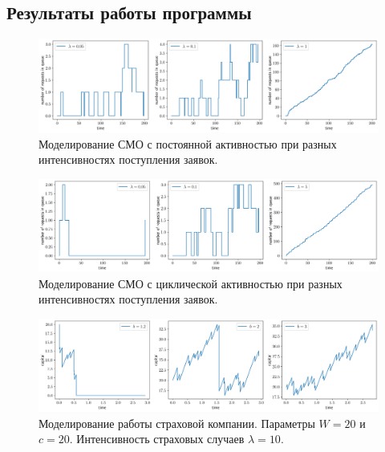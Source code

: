 \documentclass[12pt, a4paper]{article} %
\begin{document}
\subsection{Результаты работы программы}
\begin{figure}[H]
    \centering
    \includegraphics[width=\textwidth]{figures/11_vanilla.png}
    \caption{Моделирование СМО с постоянной активностью при разных интенсивностях поступления заявок.}
    \label{fig:11_vanilla}
\end{figure}
\begin{figure}[H]
    \centering
    \includegraphics[width=\textwidth]{figures/11_cyclic.png}
    \caption{Моделирование СМО с циклической активностью при разных интенсивностях поступления заявок.}
    \label{fig:11_cyclic}
\end{figure}
\begin{figure}[H]
    \centering
    \includegraphics[width=\textwidth]{figures/11_insur.png}
    \caption{Моделирование работы страховой компании. Параметры $W = 20$ и $c = 20$. Интенсивность страховых случаев $\lambda = 10$.}
    \label{fig:11_insur}
\end{figure}

\newpage



 
\end{document}

